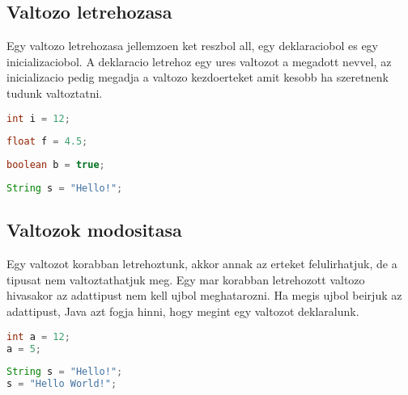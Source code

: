 \documentclass{article}
\begin{document}
\subsection{Valtozo letrehozasa}

Egy valtozo letrehozasa jellemzoen ket reszbol all, egy deklaraciobol es egy inicializaciobol. A deklaracio letrehoz egy ures valtozot a megadott nevvel, az inicializacio pedig megadja a valtozo kezdoerteket amit kesobb ha szeretnenk tudunk valtoztatni.

\begin{lstlisting}[language=Java, caption=Int valtozo deklaralasa inicializacioval. Ennek a valtozonak 12 a kezdoerteke]
int i = 12;
\end{lstlisting}

\begin{lstlisting}[language=Java, caption=Int valtozo deklaralasa inicializacioval. Ennek a valtozonak 4.5 a kezdoerteke]
float f = 4.5;
\end{lstlisting}

\newpage

\begin{lstlisting}[language=Java, caption=Boolean valtozo deklaralasa inicializacioval. Ennek a valtozonak true a  kezdoerteke]
boolean b = true;
\end{lstlisting}

\begin{lstlisting}[language=Java, caption=String valtozo deklaralasa inicializacioval. Ennek a valtozonak "Hello!" lesz a kezdoerteke]
String s = "Hello!";
\end{lstlisting}

\subsection{Valtozok modositasa}

Egy valtozot korabban letrehoztunk, akkor annak az erteket felulirhatjuk, de a tipusat nem valtoztathatjuk meg. Egy mar korabban letrehozott valtozo hivasakor az adattipust nem kell ujbol meghatarozni. Ha megis ujbol beirjuk az adattipust, Java azt fogja hinni, hogy megint egy valtozot deklaralunk.

\begin{lstlisting}[language=Java, caption=Egy 12 kezdoerteku int valtozot modositunk.]
int a = 12;
a = 5;
\end{lstlisting}

\begin{lstlisting}[language=Java, caption=Egy "Hello" kezdoerteku String valtozot modositunk.]
String s = "Hello!";
s = "Hello World!";
\end{lstlisting}
\end{document}
